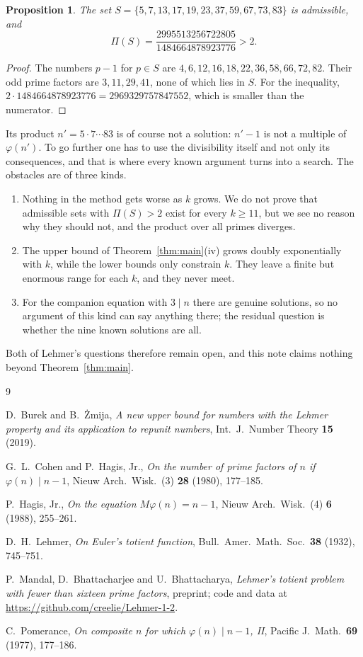 \documentclass[11pt]{amsart}
\newtheorem{proposition}[theorem]{Proposition}
\theoremstyle{definition}
\theoremstyle{remark}
\begin{document}
\begin{proposition}\label{prop:limit}
The set $S=\{5,7,13,17,19,23,37,59,67,73,83\}$ is admissible, and
\[
  \Pi(S)=\frac{2995513256722805}{1484664878923776}>2 .
\]
\end{proposition}

\begin{proof}
The numbers $p-1$ for $p\in S$ are $4,6,12,16,18,22,36,58,66,72,82$.
Their odd prime factors are $3,11,29,41$, none of which lies in $S$. For
the inequality, $2\cdot1484664878923776=2969329757847552$, which is
smaller than the numerator.
\end{proof}

Its product
$n'=5\cdot7\cdots83$ is of course not a solution: $n'-1$ is not a
multiple of $\varphi(n')$. To go further one has to use the divisibility
itself and not only its consequences, and that is where every known
argument turns into a search. The obstacles are of three kinds.
\begin{enumerate}
\item[(a)] Nothing in the method gets worse as $k$ grows. We do not
prove that admissible sets with $\Pi(S)>2$ exist for every $k\ge11$,
but we see no reason why they should not, and the product over all
primes diverges.
\item[(b)] The upper bound of Theorem~\ref{thm:main}(iv) grows doubly
exponentially with $k$, while the lower bounds only constrain $k$. They
leave a finite but enormous range for each $k$, and they never meet.
\item[(c)] For the companion equation with $3\mid n$ there are genuine
solutions, so no argument of this kind can say anything there; the
residual question is whether the nine known solutions are all.
\end{enumerate}
Both of Lehmer's questions therefore remain open, and this note claims
nothing beyond Theorem~\ref{thm:main}.

\begin{thebibliography}{9}

 D.~Burek and B.~\.Zmija, \emph{A new upper bound for
numbers with the Lehmer property and its application to repunit
numbers}, Int.\ J.\ Number Theory \textbf{15} (2019).

 G.~L.~Cohen and P.~Hagis, Jr., \emph{On the number of
prime factors of $n$ if $\varphi(n)\mid n-1$}, Nieuw Arch.\ Wisk.\ (3)
\textbf{28} (1980), 177--185.

 P.~Hagis, Jr., \emph{On the equation $M\varphi(n)=n-1$},
Nieuw Arch.\ Wisk.\ (4) \textbf{6} (1988), 255--261.

 D.~H.~Lehmer, \emph{On Euler's totient function}, Bull.\
Amer.\ Math.\ Soc.\ \textbf{38} (1932), 745--751.

 P.~Mandal, D.~Bhattacharjee and U.~Bhattacharya,
\emph{Lehmer's totient problem with fewer than sixteen prime factors},
preprint; code and data at \url{https://github.com/creelie/Lehmer-1-2}.

 C.~Pomerance, \emph{On composite $n$ for which
$\varphi(n)\mid n-1$, II}, Pacific J.\ Math.\ \textbf{69} (1977),
177--186.

\end{thebibliography}
\end{document}
